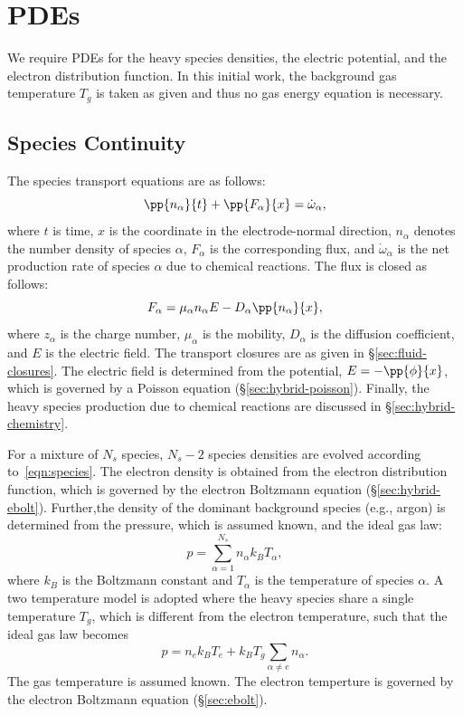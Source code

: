 \section{PDEs}
We require PDEs for the heavy species densities, the electric
potential, and the electron distribution function.  In this initial
work, the background gas temperature $T_g$ is taken as given and thus
no gas energy equation is necessary.

\subsection{Species Continuity}
The species transport equations are as follows:
%
\begin{equation}
\pp{n_{\alpha}}{t} + \pp{F_{\alpha}}{x} = \dot{\omega}_{\alpha},
\label{eqn:species}
\end{equation}
%
where $t$ is time, $x$ is the coordinate in the electrode-normal
direction, $n_{\alpha}$ denotes the number density of species
$\alpha$, $F_{\alpha}$ is the corresponding flux, and
$\dot{\omega}_{\alpha}$ is the net production rate of species $\alpha$
due to chemical reactions.  The flux is closed as follows:
%
\begin{equation*}
F_{\alpha} = \mu_{\alpha} n_{\alpha} E - D_{\alpha} \pp{n_{\alpha}}{x},
\end{equation*}
%
where $z_{\alpha}$ is the charge number, $\mu_{\alpha}$ is the
mobility, $D_{\alpha}$ is the diffusion coefficient, and $E$ is the
electric field.  The transport closures are as given in
\S\ref{sec:fluid-closures}.  The electric field is determined from the
potential, $E = -\pp{\phi}{x}$, which is governed by a Poisson
equation (\S\ref{sec:hybrid-poisson}).  Finally, the heavy species
production due to chemical reactions are discussed in
\S\ref{sec:hybrid-chemistry}.

For a mixture of $N_s$ species, $N_s - 2$ species densities are
evolved according to~\eqref{eqn:species}.  The electron density is
obtained from the electron distribution function, which is governed by
the electron Boltzmann equation (\S\ref{sec:hybrid-ebolt}).
Further,the density of the dominant background species (e.g., argon)
is determined from the pressure, which is assumed known, and the ideal
gas law:
%
\begin{equation*}
p = \sum_{\alpha = 1}^{N_s} n_{\alpha} k_B T_{\alpha},
\end{equation*}
%
where $k_B$ is the Boltzmann constant and $T_{\alpha}$ is the
temperature of species $\alpha$.  A two temperature model is adopted
where the heavy species share a single temperature $T_g$, which is
different from the electron temperature, such that the ideal gas law
becomes
%
\begin{equation*}
p = n_e k_B T_e + k_B T_g \sum_{\alpha \neq e} n_{\alpha}.
\end{equation*}
%
The gas temperature is assumed known.  The electron temperture is
governed by the electron Boltzmann equation (\S\ref{sec:ebolt}).

